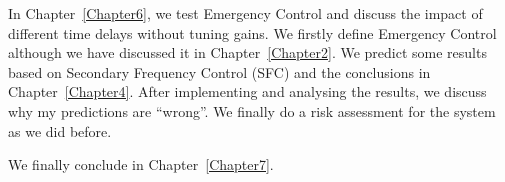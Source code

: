 In Chapter~\ref{Chapter6}, we test Emergency Control and discuss the impact of different time delays without tuning gains. We firstly define Emergency Control although we have discussed it in Chapter~\ref{Chapter2}. We predict some results based on Secondary Frequency Control (SFC) and the conclusions in Chapter~\ref{Chapter4}. After implementing and analysing the results, we discuss why my predictions are “wrong”. We finally do a risk assessment for the system as we did before. 


We finally conclude in Chapter~\ref{Chapter7}. 